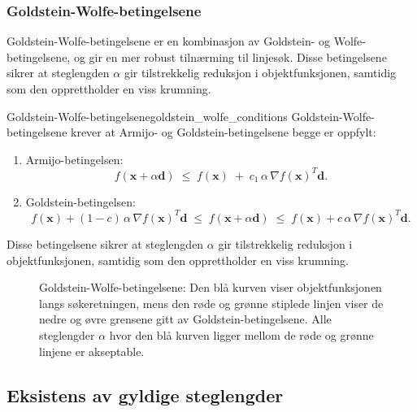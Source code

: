 \subsubsection{Goldstein-Wolfe-betingelsene}
\label{subsubsec:goldstein_wolfe_conditions}
Goldstein-Wolfe-betingelsene er en kombinasjon av Goldstein- og Wolfe-betingelsene, og gir en mer robust tilnærming til linjesøk.
Disse betingelsene sikrer at steglengden \(\alpha\) gir tilstrekkelig reduksjon i objektfunksjonen, samtidig som den opprettholder en viss krumning.
\begin{definition}{Goldstein-Wolfe-betingelsene}{goldstein_wolfe_conditions}
	Goldstein-Wolfe-betingelsene krever at Armijo- og Goldstein-betingelsene begge er oppfylt:
	\begin{enumerate}
		\item Armijo-betingelsen:
			\[
				f(\symbf{x} + \alpha \symbf{d})
				\;\le\;
				f(\symbf{x})
				\;+\;
				c_1\,\alpha\,\nabla f(\symbf{x})^T \symbf{d}.
			\]
		\item Goldstein-betingelsen:
			\[
				f(\symbf{x}) + (1-c)\,\alpha\,\nabla f(\symbf{x})^T \symbf{d}
				\;\le\;
				f(\symbf{x} + \alpha \symbf{d})
				\;\le\;
				f(\symbf{x}) + c\,\alpha\,\nabla f(\symbf{x})^T \symbf{d}.
			\]
	\end{enumerate}
	Disse betingelsene sikrer at steglengden \(\alpha\) gir tilstrekkelig reduksjon i objektfunksjonen, samtidig som den opprettholder en viss krumning.
\end{definition}
\begin{figure}[H]
	\centering
	\caption{Goldstein-Wolfe-betingelsene: Den blå kurven viser objektfunksjonen langs søkeretningen, mens den røde og grønne stiplede linjen viser de nedre og øvre grensene gitt av Goldstein-betingelsene. Alle steglengder $\alpha$ hvor den blå kurven ligger mellom de røde og grønne linjene er akseptable.}
	\label{fig:goldstein_wolfe_conditions}
\end{figure}


\subsection{Eksistens av gyldige steglengder}
\label{subsec:existence_step_length}

